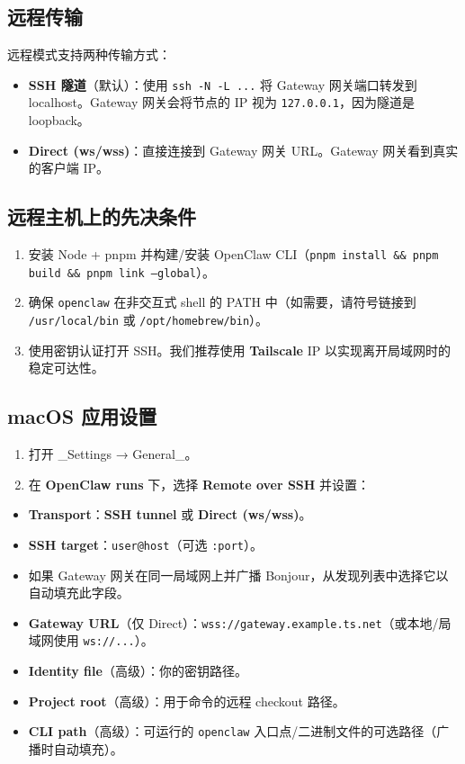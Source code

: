 \subsection{远程传输}


远程模式支持两种传输方式：

\begin{itemize}
  \item \textbf{SSH 隧道}（默认）：使用 \texttt{ssh -N -L ...} 将 Gateway 网关端口转发到 localhost。Gateway 网关会将节点的 IP 视为 \texttt{127.0.0.1}，因为隧道是 loopback。
  \item \textbf{Direct (ws/wss)}：直接连接到 Gateway 网关 URL。Gateway 网关看到真实的客户端 IP。
\end{itemize}


\subsection{远程主机上的先决条件}


\begin{enumerate}
  \item 安装 Node + pnpm 并构建/安装 OpenClaw CLI（\texttt{pnpm install \&\& pnpm build \&\& pnpm link --global}）。
  \item 确保 \texttt{openclaw} 在非交互式 shell 的 PATH 中（如需要，请符号链接到 \texttt{/usr/local/bin} 或 \texttt{/opt/homebrew/bin}）。
  \item 使用密钥认证打开 SSH。我们推荐使用 \textbf{Tailscale} IP 以实现离开局域网时的稳定可达性。
\end{enumerate}


\subsection{macOS 应用设置}


\begin{enumerate}
  \item 打开 \_Settings → General\_。
  \item 在 \textbf{OpenClaw runs} 下，选择 \textbf{Remote over SSH} 并设置：
\end{enumerate}

\begin{itemize}
  \item \textbf{Transport}：\textbf{SSH tunnel} 或 \textbf{Direct (ws/wss)}。
  \item \textbf{SSH target}：\texttt{user@host}（可选 \texttt{:port}）。
  \item 如果 Gateway 网关在同一局域网上并广播 Bonjour，从发现列表中选择它以自动填充此字段。
  \item \textbf{Gateway URL}（仅 Direct）：\texttt{wss://gateway.example.ts.net}（或本地/局域网使用 \texttt{ws://...}）。
  \item \textbf{Identity file}（高级）：你的密钥路径。
  \item \textbf{Project root}（高级）：用于命令的远程 checkout 路径。
  \item \textbf{CLI path}（高级）：可运行的 \texttt{openclaw} 入口点/二进制文件的可选路径（广播时自动填充）。
\end{itemize}

